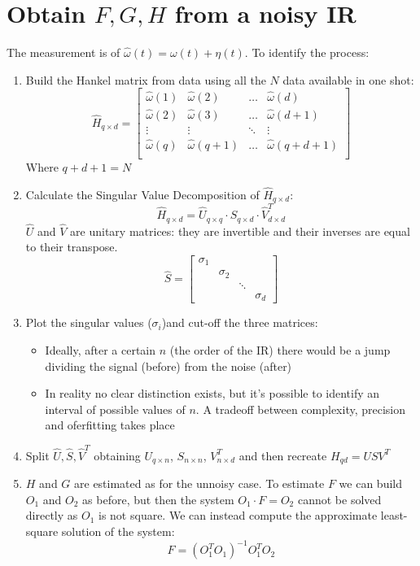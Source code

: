 \documentclass{report}
\begin{document}
\section{Obtain $F,G,H$ from a noisy IR}
The measurement is of $\hat{\omega}(t)=\omega(t)+\eta(t)$. To identify the process:
\begin{enumerate}
\item Build the Hankel matrix from data using all the $N$ data available in one shot:
\[
\hat{H}_{q \times d}=
\begin{bmatrix}
\hat{\omega}(1)&\hat{\omega}(2)&\dots&\hat{\omega}(d)\\
\hat{\omega}(2)&\hat{\omega}(3)&\dots&\hat{\omega}(d+1)\\
\vdots&\vdots&\ddots&\vdots\\
\hat{\omega}(q)&\hat{\omega}(q+1)&\dots&\hat{\omega}(q+d+1)\\
\end{bmatrix}
\]
Where $q+d+1=N$
\item Calculate the Singular Value Decomposition of $\hat{H}_{q \times d}$:
\[
\hat{H}_{q \times d}=\hat{U}_{q \times q} \cdot \hat{S}_{q \times d} \cdot \hat{V}^T_{d \times d}
\]
$\hat{U}$ and $\hat{V}$ are unitary matrices: they are invertible and their inverses are equal to their transpose.
\[
\hat{S}=\begin{bmatrix}
\sigma_1\\
&\sigma_2\\
&&\ddots\\
&&&\sigma_d
\end{bmatrix}
\]
\item Plot the singular values ($\sigma_i$)and cut-off the three matrices:
	\begin{itemize}
	\item Ideally, after a certain $n$ (the order of the IR) there would be a jump dividing the signal (before) from the noise (after)
	\item In reality no clear distinction exists, but it's possible to identify an interval of possible values of $n$. A tradeoff between complexity, precision and oferfitting takes place
	\end{itemize}
\item Split $\hat{U},\hat{S},\hat{V}^T$ obtaining $U_{q \times n}$, $S_{n \times n}$, $V^T_{n \times d}$ and then recreate $H_{qd}=USV^T$
\item $H$ and $G$ are estimated as for the unnoisy case. To estimate $F$ we can build $O_1$ and $O_2$ as before, but then the system $O_1 \cdot F = O_2$ cannot be solved directly as $O_1$ is not square. We can instead compute the approximate least-square solution of the system:
\[
F=(O_1^TO_1)^{-1}O_1^TO_2
\]
\end{enumerate}
\end{document}
